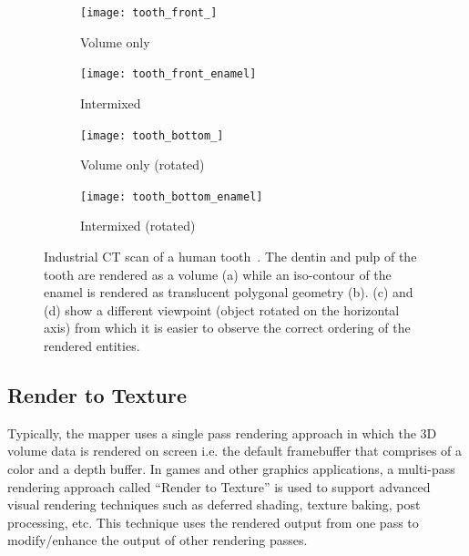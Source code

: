 \begin{figure}[ht]
\centering
  \begin{subfigure}[b]{.5\columnwidth}
    \centering
    \texttt{[image: tooth\_front\_]}
    \caption{Volume only}
    \label{fig:tooth_front}
  \end{subfigure}%
  \begin{subfigure}[b]{.5\columnwidth}
    \centering
    \texttt{[image: tooth\_front\_enamel]}
    \caption{Intermixed}
    \label{fig:tooth_front_enamel}
  \end{subfigure}
  \begin{subfigure}[b]{.5\columnwidth}
    \centering
    \texttt{[image: tooth\_bottom\_]}
    \caption{Volume only (rotated)}
    \label{fig:tooth_bottom}
  \end{subfigure}%
  \begin{subfigure}[b]{.5\columnwidth}
    \centering
    \texttt{[image: tooth\_bottom\_enamel]}
    \caption{Intermixed (rotated)}
    \label{fig:tooth_bottom_enamel}
  \end{subfigure}
  \caption{Industrial CT scan of a human tooth~\citep{pfister_transfer_2001}.
    The dentin and pulp of the tooth are rendered as a volume (a) while an
    iso-contour of the enamel is rendered as translucent polygonal geometry (b).
    (c) and (d) show a different viewpoint (object rotated on the horizontal axis)
    from which it is easier to observe the correct ordering of the rendered
    entities.}
  \label{fig:volume_peeling_tooth}
\end{figure}

\subsection{Render to Texture}
\label{rendertotexture}
Typically, the mapper uses a single pass
rendering approach in which the 3D volume data is rendered on screen i.e. the
default framebuffer that comprises of a color and a depth buffer. In games and
other graphics applications, a multi-pass rendering approach called ``Render to
Texture'' is used to support advanced visual rendering techniques such as
deferred shading, texture baking, post processing, etc. This technique uses the
rendered output from one pass to modify/enhance the output of other rendering
passes.


